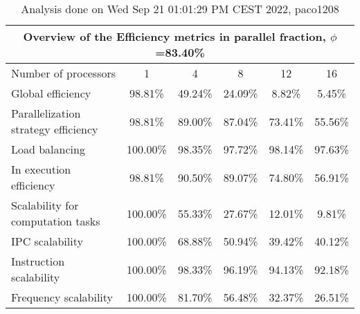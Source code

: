 \begin{table}[h]
\begin{center}
\begin{tabular}{|l|c|c|c|c|c|}
\hline
\multicolumn{6}{|c|}{Overview of the Efficiency metrics in parallel fraction, $\phi$=83.40\%} \\
\hline
\hline
Number of processors & 1 & 4 & 8 & 12 & 16 \\
\hline
\hline
Global efficiency                      &     98.81\% &     49.24\% &     24.09\% &      8.82\% &      5.45\% \\
\hline
\hline
Parallelization strategy efficiency &     98.81\% &     89.00\% &     87.04\% &     73.41\% &     55.56\% \\
\hline
Load balancing                   &    100.00\% &     98.35\% &     97.72\% &     98.14\% &     97.63\% \\
In execution efficiency          &     98.81\% &     90.50\% &     89.07\% &     74.80\% &     56.91\% \\
\hline
\hline
Scalability for computation tasks   &    100.00\% &     55.33\% &     27.67\% &     12.01\% &      9.81\% \\
\hline
IPC scalability                  &    100.00\% &     68.88\% &     50.94\% &     39.42\% &     40.12\% \\
Instruction scalability          &    100.00\% &     98.33\% &     96.19\% &     94.13\% &     92.18\% \\
Frequency scalability            &    100.00\% &     81.70\% &     56.48\% &     32.37\% &     26.51\% \\
\hline
\end{tabular}
\end{center}
\caption{ Analysis done on Wed Sep 21 01:01:29 PM CEST 2022, paco1208}
\end{table}
